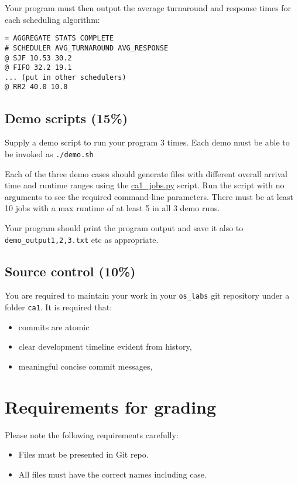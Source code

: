 \documentclass[10pt]{article}
\begin{document}
Your program must then output the average turnaround and response times for each scheduling algorithm:

\begin{verbatim}
= AGGREGATE STATS COMPLETE
# SCHEDULER AVG_TURNAROUND AVG_RESPONSE
@ SJF 10.53 30.2 
@ FIFO 32.2 19.1
... (put in other schedulers)
@ RR2 40.0 10.0
\end{verbatim}

\subsection{Demo scripts (15\%)}

Supply a demo script to run your program 3 times.
Each demo must be able to be invoked as \texttt{./demo.sh}

Each of the three demo cases should generate files with different overall arrival time and runtime ranges using the \url{ca1_jobs.py} script.
Run the script with no arguments to see the required command-line parameters.
There must be at least 10 jobs with a max runtime of at least 5 in all 3 demo runs.

Your program should print the program output and save it also to \texttt{demo\_output1,2,3.txt} etc as appropriate.

\subsection{Source control (10\%)}

You are required to maintain your work in your \texttt{os\_labs} git repository under a folder \texttt{ca1}. 
It is required that:

\begin{itemize}
  \item commits are atomic
  \item clear development timeline evident from history,
  \item meaningful concise commit messages,
\end{itemize}

\section{Requirements for grading}

Please note the following requirements carefully:

\begin{itemize}
\item Files must be presented in Git repo.
\item All files must have the correct names including case.
\end{itemize}
\end{document}
